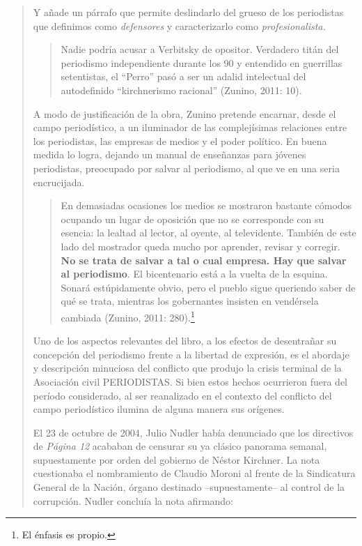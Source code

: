 {\begin{quote}
Y añade un párrafo que permite deslindarlo del grueso de los periodistas que definimos como \emph{defensores} y caracterizarlo como \emph{profesionalista.}

\begin{quote}
Nadie podría acusar a Verbitsky de opositor. Verdadero titán del periodismo independiente durante los 90 y entendido en guerrillas setentistas, el \enquote{Perro} pasó a ser un adalid intelectual del autodefinido \enquote{kirchnerismo racional} (Zunino, 2011: 10).
\end{quote}

A modo de justificación de la obra, Zunino pretende encarnar, desde el campo periodístico, a un iluminador de las complejísimas relaciones entre los periodistas, las empresas de medios y el poder político. En buena medida lo logra, dejando un manual de enseñanzas para jóvenes periodistas, preocupado por salvar al periodismo, al que ve en una seria encrucijada.

\begin{quote}
En demasiadas ocasiones los medios se mostraron bastante cómodos ocupando un lugar de oposición que no se corresponde con su esencia: la lealtad al lector, al oyente, al televidente. También de este lado del mostrador queda mucho por aprender, revisar y corregir. \textbf{No se trata de salvar a tal o cual empresa. Hay que salvar al periodismo}. El bicentenario está a la vuelta de la esquina. Sonará estúpidamente obvio, pero el pueblo sigue queriendo saber de qué se trata, mientras los gobernantes insisten en vendérsela cambiada (Zunino, 2011: 280).\footnote{El énfasis es propio.}
\end{quote}

Uno de los aspectos relevantes del libro, a los efectos de desentrañar su concepción del periodismo frente a la libertad de expresión, es el abordaje y descripción minuciosa del conflicto que produjo la crisis terminal de la Asociación civil PERIODISTAS. Si bien estos hechos ocurrieron fuera del período considerado, al ser reanalizado en el contexto del conflicto del campo periodístico ilumina de alguna manera sus orígenes.

El 23 de octubre de 2004, Julio Nudler había denunciado que los directivos de \emph{Página 12} acababan de censurar su ya clásico panorama semanal, supuestamente por orden del gobierno de Néstor Kirchner. La nota cuestionaba el nombramiento de Claudio Moroni al frente de la Sindicatura General de la Nación, órgano destinado --supuestamente-- al control de la corrupción. Nudler concluía la nota afirmando:


\end{quote}}
